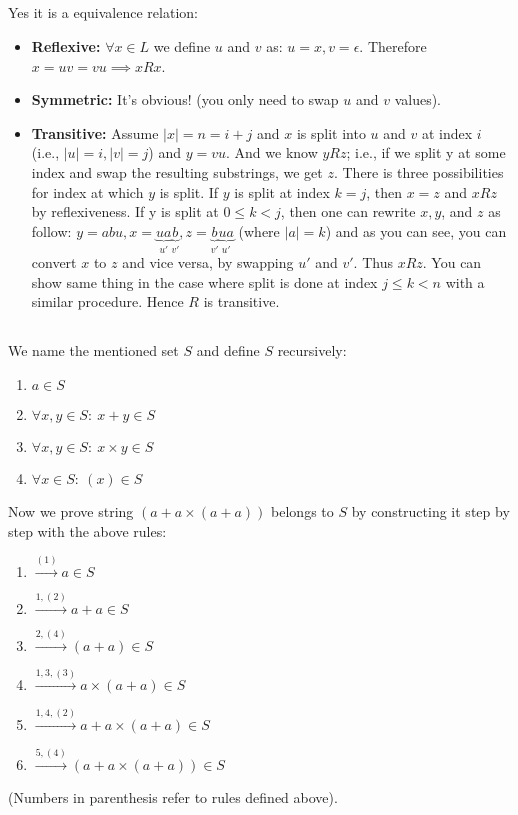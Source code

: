 \documentclass[11pt]{article}
\newcommand{\abs}[1]{\vert #1\vert}
\begin{document}
\subsection{}
Yes it is a equivalence relation:
\begin{itemize}
\item \textbf{Reflexive:} \(\forall x \in L\) we define \(u\) and \(v\) as: \(u = x, v=\epsilon\).
Therefore \(x = uv = vu \implies xRx\).
\item \textbf{Symmetric:} It's obvious! (you only need to swap \(u\) and \(v\) values).
\item \textbf{Transitive:} Assume \(\abs{x} = n=i+j\) and \(x\) is split into \(u\) and \(v\) at index \(i\) (i.e., \(\abs{u}=i, \abs{v}=j\))
and \(y=vu\).
And we know \(yRz\); i.e., if we split y at some index and swap the resulting substrings, we get \(z\).
There is three possibilities for index at which \(y\) is split.
If \(y\) is split at index \(k=j\), then \(x=z\) and \(xRz\) by reflexiveness.
If y is split at \(0\leq k < j\), then one can rewrite \(x, y\), and \(z\) as follow:
\(y=abu, x=\underbrace{ua}_{u\prime}\underbrace{b}_{v\prime}, z=\underbrace{b}_{v\prime}\underbrace{ua}_{u\prime}\) (where \(\abs{a} = k\)) and as you can see, you can convert \(x\) to \(z\) and vice versa, by swapping \(u\prime\) and \(v\prime\).
Thus \(xRz\).
You can show same thing in the case where split is done at index \(j \leq k < n\) with a similar procedure.
Hence \(R\) is transitive.
\end{itemize}
\subsection{}
\subsubsection{}
We name the mentioned set \(S\) and define \(S\) recursively:
\begin{enumerate}[label=\textnormal{(\arabic*)}]
    \item \(a \in S\)
    \item \(\forall x, y \in S: \ x+y \in S\)
    \item \(\forall x, y \in S: \ x\times y \in S\)
    \item \(\forall x \in S: \ (x) \in S\)
\end{enumerate}
Now we prove string \((a + a \times (a + a))\) belongs to \(S\) by constructing it step by step with the above rules:
\begin{enumerate}
\item \(\xrightarrow{(1)} a \in S\)
\item \(\xrightarrow{1, (2)} a + a \in S\)
\item \(\xrightarrow{2, (4)} (a + a) \in S\)
\item \(\xrightarrow{1, 3, (3)} a\times (a + a) \in S\) 
\item \(\xrightarrow{1, 4, (2)} a + a\times (a + a) \in S\) 
\item \(\xrightarrow{5, (4)} (a + a\times (a + a)) \in S\) 
\end{enumerate}
(Numbers in parenthesis refer to rules defined above).
\end{document}
